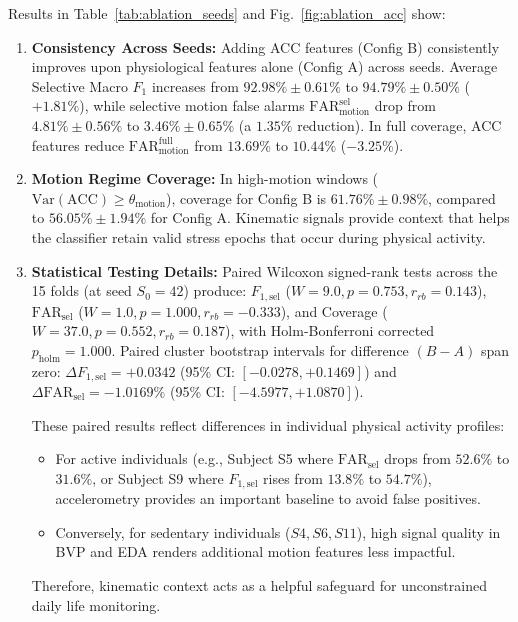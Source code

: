 \documentclass[conference]{IEEEtran}
\begin{document}
Results in Table~\ref{tab:ablation_seeds} and Fig.~\ref{fig:ablation_acc} show:
\begin{enumerate}
    \item \textbf{Consistency Across Seeds:} Adding ACC features (Config B) consistently improves upon physiological features alone (Config A) across seeds. Average Selective Macro $F_1$ increases from $92.98\% \pm 0.61\%$ to $94.79\% \pm 0.50\%$ ($+1.81\%$), while selective motion false alarms $\text{FAR}_{\text{motion}}^{\text{sel}}$ drop from $4.81\% \pm 0.56\%$ to $3.46\% \pm 0.65\%$ (a $1.35\%$ reduction). In full coverage, ACC features reduce $\text{FAR}_{\text{motion}}^{\text{full}}$ from $13.69\%$ to $10.44\%$ ($-3.25\%$).
    \item \textbf{Motion Regime Coverage:} In high-motion windows ($\text{Var}(\text{ACC}) \ge \theta_{\text{motion}}$), coverage for Config B is $61.76\% \pm 0.98\%$, compared to $56.05\% \pm 1.94\%$ for Config A. Kinematic signals provide context that helps the classifier retain valid stress epochs that occur during physical activity.
    \item \textbf{Statistical Testing Details:} Paired Wilcoxon signed-rank tests across the 15 folds (at seed $S_0=42$) produce: $F_{1,\text{sel}}$ ($W = 9.0, p = 0.753, r_{rb} = 0.143$), $\text{FAR}_{\text{sel}}$ ($W = 1.0, p = 1.000, r_{rb} = -0.333$), and Coverage ($W = 37.0, p = 0.552, r_{rb} = 0.187$), with Holm-Bonferroni corrected $p_{\text{holm}} = 1.000$. Paired cluster bootstrap intervals for difference $(B - A)$ span zero: $\Delta F_{1,\text{sel}} = +0.0342$ (95\% CI: $[-0.0278, +0.1469]$) and $\Delta \text{FAR}_{\text{sel}} = -1.0169\%$ (95\% CI: $[-4.5977, +1.0870]$).

    These paired results reflect differences in individual physical activity profiles:
    \begin{itemize}
        \item For active individuals (e.g., Subject S5 where $\text{FAR}_{\text{sel}}$ drops from $52.6\%$ to $31.6\%$, or Subject S9 where $F_{1,\text{sel}}$ rises from $13.8\%$ to $54.7\%$), accelerometry provides an important baseline to avoid false positives.
        \item Conversely, for sedentary individuals ($S4, S6, S11$), high signal quality in BVP and EDA renders additional motion features less impactful.
    \end{itemize}
    Therefore, kinematic context acts as a helpful safeguard for unconstrained daily life monitoring.
\end{enumerate}
\end{document}
